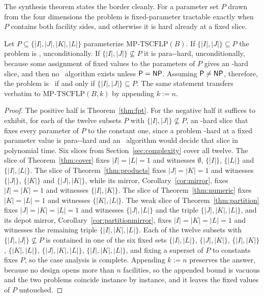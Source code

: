 The synthesis theorem states the border cleanly. For a parameter set $P$
drawn from the four dimensions the problem is fixed-parameter tractable
exactly when $P$ contains both facility sides, and otherwise it is hard
already at a fixed slice.

\begin{theorem}[dichotomy]\label{thm:dichotomy}
Let $P\subseteq\{|I|,|J|,|K|,|L|\}$ parameterize
$\mathrm{MP\text{-}TSCFLP}(B)$. If $\{|I|,|J|\}\subseteq P$ the problem is
\FPT, unconditionally. If $\{|I|,|J|\}\not\subseteq P$ it is
para-\NP-hard, unconditionally, because some assignment of fixed values to
the parameters of $P$ gives an \NP-hard slice, and then no \XP\ algorithm
exists unless $\textsf{P}=\textsf{NP}$. Assuming $\textsf{P}\ne\textsf{NP}$, therefore, the
problem is \FPT\ if and only if $\{|I|,|J|\}\subseteq P$. The same
statement transfers verbatim to $\mathrm{MP\text{-}TSCFLP}(B,k)$ by
appending $k:=n$.
\end{theorem}
\begin{proof}
The positive half is Theorem~\ref{thm:fpt}. For the negative half it
suffices to exhibit, for each of the twelve subsets $P$ with
$\{|I|,|J|\}\not\subseteq P$, an \NP-hard slice that fixes every parameter
of $P$ to the constant one, since a problem \NP-hard at a fixed parameter
value is para-\NP-hard and an \XP\ algorithm would decide that slice in
polynomial time. Six slices from Section~\ref{sec:complexity} cover all
twelve. The slice of Theorem~\ref{thm:cover} fixes $|I|=|L|=1$ and
witnesses $\emptyset$, $\{|I|\}$, $\{|L|\}$ and $\{|I|,|L|\}$. The slice of
Theorem~\ref{thm:products} fixes $|J|=|K|=1$ and witnesses $\{|J|\}$,
$\{|K|\}$ and $\{|J|,|K|\}$, while its mirror, Corollary~\ref{cor:mirror},
fixes $|I|=|K|=1$ and witnesses $\{|I|,|K|\}$. The slice of
Theorem~\ref{thm:numeric} fixes $|K|=|L|=1$ and witnesses $\{|K|,|L|\}$.
The weak slice of Theorem~\ref{thm:partition} fixes $|J|=|K|=|L|=1$ and
witnesses $\{|J|,|L|\}$ and the triple $\{|J|,|K|,|L|\}$, and its depot
mirror, Corollary~\ref{cor:partitionmirror}, fixes $|I|=|K|=|L|=1$ and
witnesses the remaining triple $\{|I|,|K|,|L|\}$. Each of the twelve
subsets with $\{|I|,|J|\}\not\subseteq P$ is contained in one of the six
fixed sets $\{|I|,|L|\}$, $\{|J|,|K|\}$, $\{|I|,|K|\}$, $\{|K|,|L|\}$,
$\{|J|,|K|,|L|\}$, $\{|I|,|K|,|L|\}$, and fixing a superset of $P$ to
constants fixes $P$, so the case analysis is complete. Appending $k:=n$
preserves the answer, because no design opens more than $n$ facilities,
so the appended bound is vacuous and the two problems coincide instance
by instance, and it leaves the fixed values of $P$ untouched.
\end{proof}

